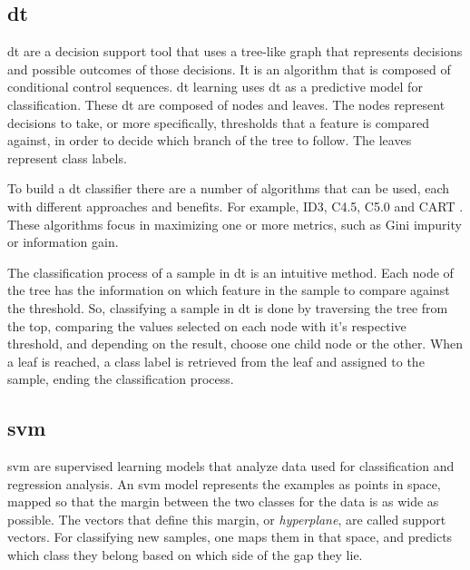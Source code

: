 \subsection{\acl{dt}}
\label{ssec:DecisionTrees}

\ac{dt} are a decision support tool that uses a tree-like graph that represents decisions and possible outcomes of those decisions. It is an algorithm that is composed of conditional control sequences. \ac{dt} learning uses \ac{dt} as a predictive model for classification.
These \ac{dt} are composed of nodes and leaves. The nodes represent decisions to take, or more specifically, thresholds that a feature is compared against, in order to decide which branch of the tree to follow. The leaves represent class labels.

To build a \ac{dt} classifier there are a number of algorithms that can be used, each with different approaches and benefits. For example, ID3, C4.5, C5.0 and CART \cite{strobl2009introduction}. These algorithms focus in maximizing one or more metrics, such as Gini impurity or information gain.

The classification process of a sample in \ac{dt} is an intuitive method. Each node of the tree has the information on which feature in the sample to compare against the threshold. So, classifying a sample in \ac{dt} is done by traversing the tree from the top, comparing the values selected on each node with it's respective threshold, and depending on the result, choose one child node or the other. When a leaf is reached, a class label is retrieved from the leaf and assigned to the sample, ending the classification process.


\subsection{\acl{svm}}
\label{ssec:SuportVectorMachines}

\ac{svm} are supervised learning models that analyze data used for classification and regression analysis. An \ac{svm} model represents the examples as points in space, mapped so that the margin between the two classes for the data is as wide as possible. The vectors that define this margin, or \textit{hyperplane}, are called support vectors. For classifying new samples, one maps them in that space, and predicts which class they belong based on which side of the gap they lie.

